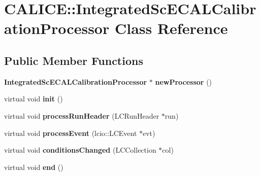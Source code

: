 \section{CALICE::IntegratedScECALCalibrationProcessor Class Reference}
\label{classCALICE_1_1IntegratedScECALCalibrationProcessor}
\subsection*{Public Member Functions}
\begin{DoxyCompactItemize}
\item 
{\bf IntegratedScECALCalibrationProcessor} $\ast$ {\bfseries newProcessor} ()\label{classCALICE_1_1IntegratedScECALCalibrationProcessor_a80d8d7e14fa1e0838dc6b95f087a2705}

\item 
virtual void {\bfseries init} ()\label{classCALICE_1_1IntegratedScECALCalibrationProcessor_aa1eab42e9957dfcf3eb2c6c6fb91a13f}

\item 
virtual void {\bfseries processRunHeader} (LCRunHeader $\ast$run)\label{classCALICE_1_1IntegratedScECALCalibrationProcessor_acdffaa1d6fc44f196e4cb7a70cd02fcc}

\item 
virtual void {\bfseries processEvent} (lcio::LCEvent $\ast$evt)\label{classCALICE_1_1IntegratedScECALCalibrationProcessor_ab52608ef6b36d9af3a84eedf6654cece}

\item 
virtual void {\bfseries conditionsChanged} (LCCollection $\ast$col)\label{classCALICE_1_1IntegratedScECALCalibrationProcessor_a50ff3bbb91c9e9f16882507b10b4edf7}

\item 
virtual void {\bfseries end} ()\label{classCALICE_1_1IntegratedScECALCalibrationProcessor_a4d3b93362d14bec35af499d016a21cd2}

\end{DoxyCompactItemize}
